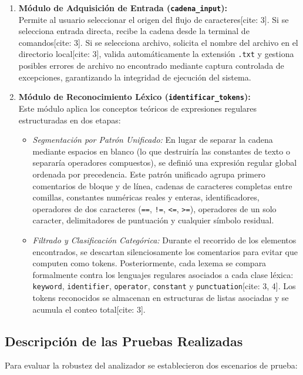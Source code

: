 \documentclass[letterpaper,12pt,oneside]{article}
\begin{document}
\begin{enumerate}
    \item \textbf{Módulo de Adquisición de Entrada (\texttt{cadena\_input}):} \\
    Permite al usuario seleccionar el origen del flujo de caracteres[cite: 3]. Si se selecciona entrada directa, recibe la cadena desde la terminal de comandos[cite: 3]. Si se selecciona archivo, solicita el nombre del archivo en el directorio local[cite: 3], valida automáticamente la extensión \texttt{.txt} y gestiona posibles errores de archivo no encontrado mediante captura controlada de excepciones, garantizando la integridad de ejecución del sistema.
    
    \item \textbf{Módulo de Reconocimiento Léxico (\texttt{identificar\_tokens}):} \\
    Este módulo aplica los conceptos teóricos de expresiones regulares estructuradas en dos etapas:
    \begin{itemize}
        \item \textit{Segmentación por Patrón Unificado:} En lugar de separar la cadena mediante espacios en blanco (lo que destruiría las constantes de texto o separaría operadores compuestos), se definió una expresión regular global ordenada por precedencia. Este patrón unificado agrupa primero comentarios de bloque y de línea, cadenas de caracteres completas entre comillas, constantes numéricas reales y enteras, identificadores, operadores de dos caracteres (\texttt{==}, \texttt{!=}, \texttt{<=}, \texttt{>=}), operadores de un solo caracter, delimitadores de puntuación y cualquier símbolo residual.
        \item \textit{Filtrado y Clasificación Categórica:} Durante el recorrido de los elementos encontrados, se descartan silenciosamente los comentarios para evitar que computen como tokens. Posteriormente, cada lexema se compara formalmente contra los lenguajes regulares asociados a cada clase léxica: \texttt{keyword}, \texttt{identifier}, \texttt{operator}, \texttt{constant} y \texttt{punctuation}[cite: 3, 4]. Los tokens reconocidos se almacenan en estructuras de listas asociadas y se acumula el conteo total[cite: 3].
    \end{itemize}
\end{enumerate}

\subsection{Descripción de las Pruebas Realizadas}
Para evaluar la robustez del analizador se establecieron dos escenarios de prueba:
\end{document}
